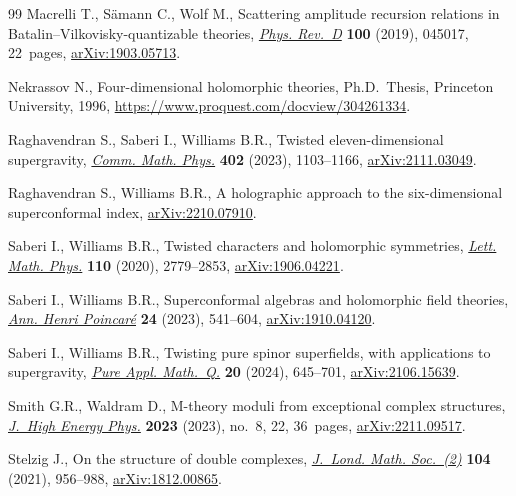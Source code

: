 \documentclass[10pt,a4paper]{amsart}
\numberwithin{equation}{section}
\theoremstyle{definition}
\begin{document}
\begin{thebibliography}{99}
Macrelli T., S\"amann C., Wolf M., Scattering amplitude recursion relations in
 {B}atalin--{V}ilkovisky-quantizable theories,
 \href{https://doi.org/10.1103/physrevd.100.045017}{\textit{Phys. Rev.~D}}
 \textbf{100} (2019), 045017, 22~pages,
 \href{http://arxiv.org/abs/1903.05713}{arXiv:1903.05713}.

Nekrassov N., Four-dimensional holomorphic theories, Ph.D.~Thesis, {P}rinceton
 University, 1996, \url{https://www.proquest.com/docview/304261334}.

Raghavendran S., Saberi I., Williams B.R., Twisted eleven-dimensional
 supergravity, \href{https://doi.org/10.1007/s00220-023-04745-2}{\textit{Comm.
 Math. Phys.}} \textbf{402} (2023), 1103--1166,
 \href{http://arxiv.org/abs/2111.03049}{arXiv:2111.03049}.

Raghavendran S., Williams B.R., A holographic approach to the six-dimensional
 superconformal index,
 \href{http://arxiv.org/abs/2210.07910}{arXiv:2210.07910}.

Saberi I., Williams B.R., Twisted characters and holomorphic symmetries,
 \href{https://doi.org/10.1007/s11005-020-01319-4}{\textit{Lett. Math. Phys.}}
 \textbf{110} (2020), 2779--2853,
 \href{http://arxiv.org/abs/1906.04221}{arXiv:1906.04221}.

Saberi I., Williams B.R., Superconformal algebras and holomorphic field
 theories, \href{https://doi.org/10.1007/s00023-022-01224-7}{\textit{Ann.
 Henri Poincar\'e}} \textbf{24} (2023), 541--604,
 \href{http://arxiv.org/abs/1910.04120}{arXiv:1910.04120}.

Saberi I., Williams B.R., Twisting pure spinor superfields, with applications
 to supergravity,
 \href{https://doi.org/10.4310/pamq.2024.v20.n2.a2}{\textit{Pure Appl.
 Math.~Q.}} \textbf{20} (2024), 645--701,
 \href{http://arxiv.org/abs/2106.15639}{arXiv:2106.15639}.

Smith G.R., Waldram D., M-theory moduli from exceptional complex structures,
 \href{https://doi.org/10.1007/jhep08(2023)022}{\textit{J.~High Energy Phys.}}
 \textbf{2023} (2023), no.~8, 22, 36~pages,
 \href{http://arxiv.org/abs/2211.09517}{arXiv:2211.09517}.

Stelzig J., On the structure of double complexes,
 \href{https://doi.org/10.1112/jlms.12453}{\textit{J.~Lond. Math. Soc.~(2)}}
 \textbf{104} (2021), 956--988,
 \href{http://arxiv.org/abs/1812.00865}{arXiv:1812.00865}.


\end{thebibliography}
\end{document}
